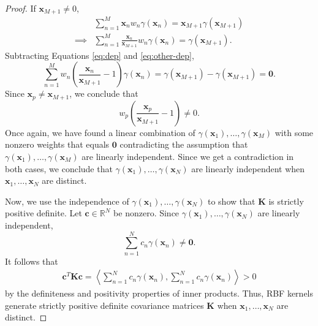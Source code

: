 \begin{proof}
    If $\mathbf{x}_{M + 1} \neq 0$,
    \begin{align}
        & \sum\limits_{n=1}^{M} \mathbf{x}_n w_n \gamma(\mathbf{x}_n) = {\mathbf{x}_{M + 1}}\gamma(\mathbf{x}_{M + 1}) \\
        \implies & \sum\limits_{n=1}^{M} \frac{\mathbf{x}_n}{\mathbf{x}_{M + 1}} w_n \gamma(\mathbf{x}_n) = \gamma(\mathbf{x}_{M + 1}). \label{eq:other-dep}
    \end{align}
    Subtracting Equations \ref{eq:dep} and \ref{eq:other-dep},
    \begin{equation*}
        \sum\limits_{n=1}^{M} w_n \left(\frac{\mathbf{x}_n}{\mathbf{x}_{M + 1}} - 1\right) \gamma(\mathbf{x}_n) = \gamma(\mathbf{x}_{M + 1}) - \gamma(\mathbf{x}_{M + 1}) = \mathbf{0}.
    \end{equation*}
    Since $\mathbf{x}_p \neq \mathbf{x}_{M + 1}$, we conclude that
    \begin{equation*}
        w_p\left(\frac{ \mathbf{x}_p }{ \mathbf{x}_{M + 1} } - 1\right) \neq 0.
    \end{equation*}
    Once again, we have found a linear combination of $\gamma(\mathbf{x}_1), \dots, \gamma(\mathbf{x}_M)$ with some nonzero weights that equals $\mathbf{0}$ contradicting the assumption that $\gamma(\mathbf{x}_1), \dots, \gamma(\mathbf{x}_M)$ are linearly independent.
    Since we get a contradiction in both cases, we conclude that $\gamma(\mathbf{x}_1), \dots, \gamma(\mathbf{x}_N)$ are linearly independent when $\mathbf{x}_1, \dots, \mathbf{x}_N$ are distinct.

    Now, we use the independence of $\gamma(\mathbf{x}_1), \dots, \gamma(\mathbf{x}_N)$ to show that $\mathbf{K}$ is strictly positive definite.
    Let $\mathbf{c} \in \mathbb{R}^{N}$ be nonzero.
    Since $\gamma(\mathbf{x}_1), \dots, \gamma(\mathbf{x}_N)$ are linearly independent,
    \begin{equation*}
        \sum\limits_{n = 1}^{N} c_n \gamma(\mathbf{x}_n) \neq \mathbf{0}.
    \end{equation*}
    It follows that
    \begin{align*}
        \mathbf{c}^{T} \mathbf{K} \mathbf{c}
        = \left\langle \sum\limits_{n = 1}^{N} c_n \gamma(\mathbf{x}_n), \sum\limits_{n = 1}^{N} c_n \gamma(\mathbf{x}_n) \right\rangle
        > 0
    \end{align*}
    by the definiteness and positivity properties of inner products.
    Thus, RBF kernels generate strictly positive definite covariance matrices $\mathbf{K}$ when $\mathbf{x}_1, \dots, \mathbf{x}_N$ are distinct.
\end{proof}

